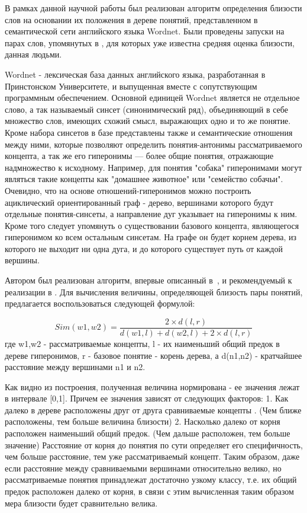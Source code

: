 В рамках данной научной работы был реализован алгоритм определения близости слов
на основании их положения в дереве понятий, представленном в семантической сети
английского языка Wordnet\cite{wordnet}.
Были проведены запуски на парах слов, упомянутых в \cite{complexSim},
для которых уже известна средняя оценка близости, данная людьми.

Wordnet\cite{wordnet} - лексическая база данных английского языка,
разработанная в Принстонском Университете, и выпущенная вместе с сопутствующим
программным обеспечением.
Основной единицей Wordnet является не отдельное слово, а так
называемый синсет (синонимический ряд),
объединяющий в себе множество слов, имеющих схожий смысл, выражающих
одно и то же понятие.
Кроме набора синсетов в базе представлены также и семантические
отношения между ними,
которые позволяют определить понятия-антонимы рассматриваемого концепта,
а так же его гиперонимы --- более общие понятия, отражающие надмножество
к исходному.
Например, для понятия "собака" гиперонимами могут являться такие концепты
как "домашнее животное" или "семейство собачьи".
Очевидно, что на основе отношений-гиперонимов можно построить
ациклический ориентированный граф - дерево, вершинами которого
будут отдельные понятия-синсеты, а направление дуг указывает на
гиперонимы к ним.
Кроме того следует упомянуть о существовании базового концепта, являющегося
гиперонимом ко всем остальным синсетам. На графе он будет корнем дерева,
из которого не выходит ни одна дуга, и до которого существует путь от
каждой вершины.

Автором был реализован алгоритм, впервые описанный  
в~\cite{inproceedings},
и рекомендуемый к реализации в \cite{complexSim}.
Для вычисления величины, определяющей близость пары понятий, предлагается
воспользоваться следующей формулой:

\begin{equation}
Sim(w1, w2) = \frac{ 2\times d(l, r) }
                               { d(w1, l) + d(w2, l) + 2\times d(l,r) }
\end{equation}
где w1,w2 - рассматриваемые концепты, l - их наименьший общий предок в
дереве гиперонимов,
r - базовое понятие - корень дерева, а d(n1,n2) - кратчайшее
расстояние между вершинами n1 и n2.

Как видно из построения, полученная величина нормирована - ее значения лежат
в интервале [0,1].
Причем ее значения зависят от следующих факторов:
1. Как далеко в дереве расположены друг от друга сравниваемые концепты .
 (Чем ближе расположены, тем больше величина близости)
2. Насколько далеко от корня расположен наименьший общий предок.
  (Чем дальше расположен, тем больше значение)
Расстояние от корня до понятия по сути определяет его специфичность,
чем больше расстояние, тем уже рассматриваемый концепт.
Таким образом, даже если расстояние между сравниваемыми вершинами
относительно велико, но рассматриваемые понятия принадлежат
достаточно узкому классу, т.е. их общий предок расположен далеко от корня,
в связи с  этим вычисленная таким образом мера близости будет
сравнительно велика.

